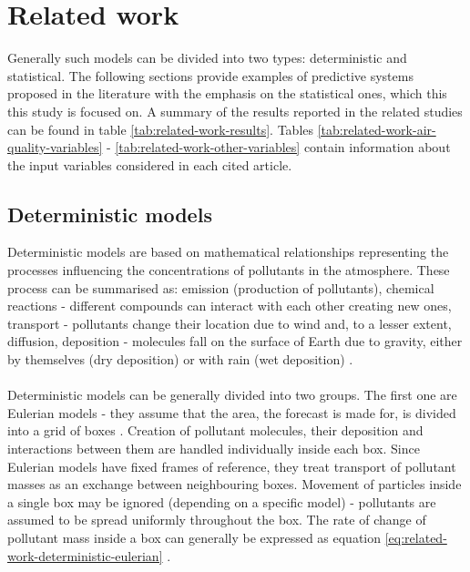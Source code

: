 \chapter{Related work}\label{chap:related-work}
Generally such models can be divided into two types: deterministic and statistical. The following sections provide examples of predictive systems proposed in the literature with the emphasis on the statistical ones, which this this study is focused on. A summary of the results reported in the related studies can be found in table \ref{tab:related-work-results}. Tables \ref{tab:related-work-air-quality-variables} - \ref{tab:related-work-other-variables} contain information about the input variables considered in each cited article.

\section{Deterministic models}
Deterministic models are based on mathematical relationships representing the processes influencing the concentrations of pollutants in the atmosphere. These process can be summarised as: emission (production of pollutants), chemical reactions - different compounds can interact with each other creating new ones, transport - pollutants change their location due to wind and, to a lesser extent, diffusion, deposition - molecules fall on the surface of Earth due to gravity, either by themselves (dry deposition) or with rain (wet deposition) \cite{JACOBI1999}.
\\\\
Deterministic models can be generally divided into two groups. The first one are Eulerian models - they assume that the area, the forecast is made for, is divided into a grid of boxes \cite{MCMURRY2004}. Creation of pollutant molecules, their deposition and interactions between them are handled individually inside each box. Since Eulerian models have fixed frames of reference, they treat transport of pollutant masses as an exchange between neighbouring boxes. Movement of particles inside a single box may be ignored (depending on a specific model) - pollutants are assumed to be spread uniformly throughout the box. The rate of change of pollutant mass inside a box can generally be expressed as equation \ref{eq:related-work-deterministic-eulerian} \cite{JACOBI1999}.

